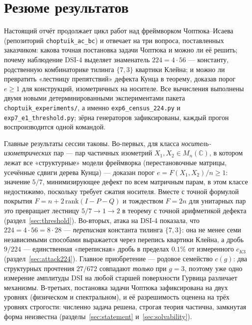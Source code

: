 \documentclass[11pt,a4paper]{article}
\theoremstyle{definition}
\theoremstyle{remark}
\begin{document}
\tableofcontents
\newpage

\section{Резюме результатов}\label{sec:summary}

Настоящий отчёт продолжает цикл работ над фреймворком Чоптюка--Исаева
(репозиторий \texttt{choptuik\_\allowbreak ac\_\allowbreak bc}) и отвечает
на три вопроса, поставленных
заказчиком: какова точная постановка задачи Чоптюка и можно ли её решить;
почему наблюдение DSI-4 выделяет знаменатель $224 = 4\cdot 56$ --- константу,
родственную комбинаторике тилинга $\{7,3\}$ квартики Клейна; и можно ли
превратить «лестницу препятствий» дефекта Кунца в теорему, доказав порог
$e \ge 1$ для конструкций, изометричных на носителе. Все вычисления выполнены двумя новыми
детерминированными экспериментами пакета
\texttt{choptuik\_\allowbreak experiments/}, а именно
\texttt{exp6\_\allowbreak census\_\allowbreak 224.py} и
\texttt{exp7\_\allowbreak e1\_\allowbreak threshold.py};
зёрна генераторов зафиксированы, каждый прогон воспроизводится одной командой.

Главные результаты сессии таковы. Во-первых, для класса \emph{носитель-изометрических}
пар --- пар частичных изометрий $X_1, X_2 \in M_n(\mathbb{C})$, в котором лежат
все «структурные» модели фреймворка (перестановочные матрицы, усечённые сдвиги
дерева Кунца) --- доказан порог $e = F(X_1,X_2)/n \ge 1$: значение $5/7$,
минимизирующее дефект по всем матричным парам, в этом классе недостижимо,
поскольку требует сжатия носителя. Вместе с точной формулой покрытия
$F = n + 2\,\mathrm{rank}(I - P - Q)$ и тождеством $F = 2n$ для унитарных пар
это превращает лестницу $5/7 \to 1 \to 2$ в теорему с точной арифметикой
дефекта (раздел~\ref{sec:threshold}). Во-вторых, атака на DSI-4 показала, что
$224 = 4\cdot 56 = 8\cdot 28$ --- \emph{переписная} константа тилинга $\{7,3\}$:
она не менее семи независимыми способами выражается через перепись квартики
Клейна, а дробь $9/224$ --- единственная «переписная» дробь в пределах $0.1\%$
от измеренного $c_{K3}$ (раздел~\ref{sec:attack224}). Главное приобретение ---
родовое семейство $c(g)$: два структурных прочтения $27/672$ совпадают
\emph{только} при $g = 3$, поэтому уже одно измерение амплитуды DSI на любой
старшей поверхности Гурвица различает механизмы. В-третьих, постановка задачи
Чоптюка зафиксирована на двух уровнях (физическом и спектральном), и её
разрешимость оценена на трёх уровнях строгости: численно задача решена,
строгая теория частична, замкнутая форма неизвестна (разделы~\ref{sec:statement}
и~\ref{sec:solvability}).
\end{document}
